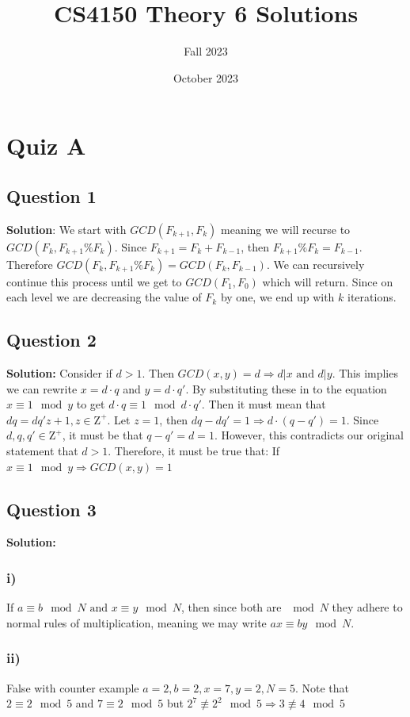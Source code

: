 \documentclass{article}
\title{CS4150 Theory 6 Solutions}
\author{Fall 2023}
\date{October 2023}
\begin{document}
\maketitle

\section*{Quiz A}
\subsection*{Question 1}

\textbf{Solution}: We start with $GCD(F_{k+1}, F_k)$ meaning we will recurse to $GCD(F_k, F_{k+1} \% F_k)$. Since $F_{k+1} = F_k + F_{k-1}$, then $F_{k+1} \% F_k = F_{k-1}$. Therefore $GCD(F_k, F_{k+1} \% F_k) = GCD(F_k, F_{k-1})$. We can recursively continue this process until we get to $GCD(F_1, F_0)$ which will return. Since on each level we are decreasing the value of $F_k$ by one, we end up with $k$ iterations.

\subsection*{Question 2}
\textbf{Solution:} Consider if $d > 1$. Then $GCD(x,y) = d \Rightarrow d | x \text{ and } d | y$. This implies we can rewrite $x = d\cdot q$ and $y = d \cdot q'$. By substituting these in to the equation $x \equiv 1 \mod y$ to get $d\cdot q \equiv 1 \mod d\cdot q'$. Then it must mean that $dq = dq'z + 1, z \in \mathrm{Z}^+$. Let $z = 1$, then $ dq - dq' = 1 \Rightarrow d\cdot(q-q') = 1$. Since $d,q,q' \in \mathrm{Z}^+$, it must be that $q-q' = d = 1$. However, this contradicts our original statement that $d > 1$. Therefore, it must be true that: If $x \equiv 1 \mod y \Rightarrow GCD(x,y)=1$

\subsection*{Question 3}
\textbf{Solution:}
\subsubsection*{i)} If $a \equiv b \mod N \text{ and } x \equiv y \mod N$, then since both are $\mod N$ they adhere to normal rules of multiplication, meaning we may write $ax\equiv by \mod N$.
\subsubsection*{ii)} False with counter example $a = 2, b = 2, x = 7, y = 2, N = 5$. Note that $2 \equiv 2 \mod 5$ and $7 \equiv 2 \mod 5$ but $2^7 \not\equiv 2^2 \mod 5 \Rightarrow 3 \not\equiv 4 \mod 5$
\end{document}
